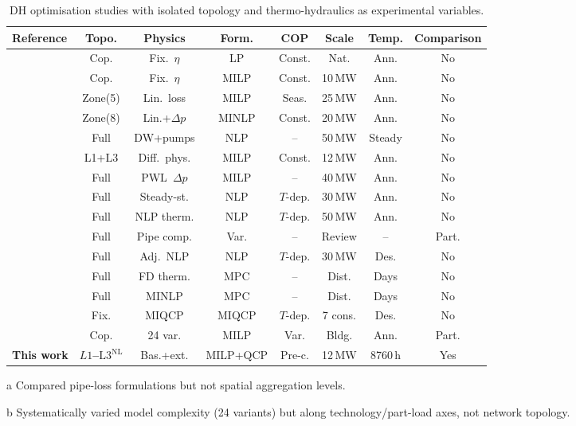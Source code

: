 \documentclass[a4paper,fleqn]{cas-dc}
\newcommand{\Lnl}{\mathrm{L3}^{\mathrm{NL}}}
\begin{document}
\begin{table}[!tbp]
\centering
\caption{DH optimisation  studies with
isolated topology and thermo-hydraulics as experimental
variables.}
\label{tab:prior_work}
\begin{threeparttable}
\footnotesize
\setlength{\tabcolsep}{4pt}
\begin{tabular}{@{}l c c c c c c c@{}}
\toprule
Reference & Topo. & Physics & Form. & COP &
  Scale & Temp. & Comparison \\
\midrule
\citet{Connolly2014_EnergyPLAN}
  & Cop. & Fix.~$\eta$ & LP & Const. & Nat. & Ann. & No \\
\citet{Gabrielli2018}
  & Cop. & Fix.~$\eta$ & MILP & Const. & 10\,MW & Ann. & No \\
\citet{Wirtz2020}
  & Zone(5) & Lin.\ loss & MILP & Seas. & 25\,MW & Ann. & No \\
\citet{Mertz2016}
  & Zone(8) & Lin.+$\Delta p$ & MINLP & Const.
  & 20\,MW & Ann. & No \\
\citet{Hari2024}
  & Full & DW+pumps & NLP & -- & 50\,MW & Steady & No \\
\citet{Leitner2019}
  & L1+L3 & Diff.\ phys. & MILP & Const. & 12\,MW
  & Ann. & No \\
\citet{Bordin2016}
  & Full & PWL~$\Delta p$ & MILP & -- & 40\,MW & Ann. & No \\
\citet{Giraud2015}
  & Full & Steady-st. & NLP & $T$-dep. & 30\,MW & Ann. & No \\
\citet{Vesterlund2017}
  & Full & NLP therm. & NLP & $T$-dep. & 50\,MW & Ann. & No \\
\citet{vanderHeijde2017}
  & Full & Pipe comp. & Var. & -- & Review & --
  & Part.\tnote{a} \\
\citet{Blommaert2020}
  & Full & Adj.\ NLP & NLP & $T$-dep. & 30\,MW & Des. & No \\
\citet{Quaggiotto2021}
  & Full & FD therm. & MPC & -- & Dist. & Days & No \\
\citet{Jansen2024}
  & Full & MINLP & MPC & -- & Dist. & Days & No \\
\citet{Hering2021}
  & Fix. & MIQCP & MIQCP & $T$-dep. & 7 cons. & Des. & No \\
\citet{Wirtz2021_complexity}
  & Cop. & 24 var. & MILP & Var. & Bldg. & Ann. & Part.\tnote{b} \\
\midrule
\textbf{This work}
  & \textbf{$L1$--$\Lnl$}
  & Bas.+ext.
  & MILP+QCP
  & Pre-c.
  & 12\,MW
  & 8760\,h
  & Yes \\
\bottomrule
\end{tabular}
\begin{tablenotes}\footnotesize
  \item[a] Compared pipe-loss formulations but not spatial
    aggregation levels.
  \item[b] Systematically varied model complexity (24 variants)
    but along technology/part-load axes, not network topology.
\end{tablenotes}
\end{threeparttable}
\end{table}
\end{document}
